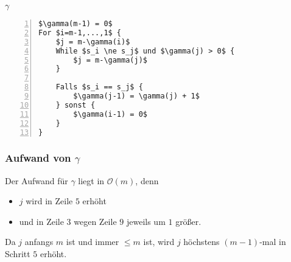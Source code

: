 \begin{minipage}{\textwidth}
\(\gamma\)
\begin{lstlisting}[frame=single,numbers=left,mathescape]
$\gamma(m-1) = 0$
For $i=m-1,...,1$ {
	$j = m-\gamma(i)$
	While $s_i \ne s_j$ und $\gamma(j) > 0$ {
		$j = m-\gamma(j)$
	}

	Falls $s_i == s_j$ {
		$\gamma(j-1) = \gamma(j) + 1$
	} sonst {
		$\gamma(i-1) = 0$
	}
}
\end{lstlisting}
\end{minipage}

\subsubsection{Aufwand von \(\gamma\)}
Der Aufwand für \(\gamma\) liegt in \(\mathcal{O}(m)\), denn
\begin{itemize}
	\item \(j\) wird in Zeile \(5\) erhöht
	\item und in Zeile \(3\) wegen Zeile \(9\) jeweils um \(1\) größer.
\end{itemize}
Da \(j\) anfangs \(m\) ist und immer \(\leq m\) ist, wird \(j\) höchstens \((m-1)\)-mal in Schritt \(5\) erhöht.

